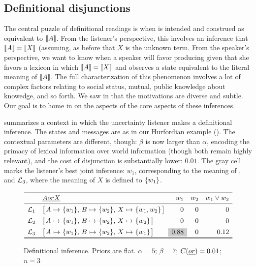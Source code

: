 \documentclass{article}
\begin{document}

\subsection{Definitional disjunctions}\label{sec:analysis:definitional}

The central puzzle of definitional readings is when  is
intended and construed as equivalent to $\llbracket A\rrbracket$. From the listener's
perspective, this involves an inference that $\llbracket A\rrbracket=\llbracket X\rrbracket$
(assuming, as before that $X$ is the unknown term. From the speaker's
perspective, we want to know when a speaker will favor producing
 given that she favors a lexicon in which
$\llbracket A\rrbracket=\llbracket X\rrbracket$ and observes a state equivalent to the literal
meaning of $\llbracket A\rrbracket$. The full characterization of this phenomenon
involves a lot of complex factors relating to social status, mutual,
public knowledge about knowedge, and so forth. We saw in
 that the motivations are diverse and subtle. Our
goal is to home in on the aspects of the core aspects of these
inferences.

 summarizes a context in which the uncertainty
listener makes a definitional inference. The states and messages are
as in our Hurfordian example (). The contextual
parameters are different, though: $\beta$ is now larger than $\alpha$,
encoding the primacy of lexical information over world information
(though both remain highly relevant), and the cost of disjunction is
substantially lower: $0.01$. The gray cell marks the listener's
best joint inference: $w_{1}$, corresponding to the meaning of ,
and $\mathcal{L}_{3}$, where the meaning of $X$ is defined to $\left\{ w_{1} \right\}$.

\begin{figure}[tp]
  \centering
  $\begin{array}[c]{l l r r r}
    \toprule
      & \word{A or X}  & w_{1} & w_{2} & w_{1} \vee w_{2} \\
    \midrule
    \Lex_{1} & \smallhurfordlex{w_{1}}{w_{2}}{w_{1}, w_{2}} & 0 & 0 & 0 \\[1ex]
    \Lex_{2} & \smallhurfordlex{w_{1}}{w_{2}}{w_{2}}        & 0 & 0 & 0 \\[1ex]
    \Lex_{3} & \smallhurfordlex{w_{1}}{w_{2}}{w_{1}}        & \graycell{0.88} & 0 & 0.12\\
    \bottomrule
  \end{array}$
  \caption{Definitional inference.
    Priors are flat. 
    $\alpha = 5$; 
    $\beta = 7$; 
    $C(\emph{or}) = 0.01$; 
    $n = 3$}
  \label{fig:def}
\end{figure}
\end{document}
